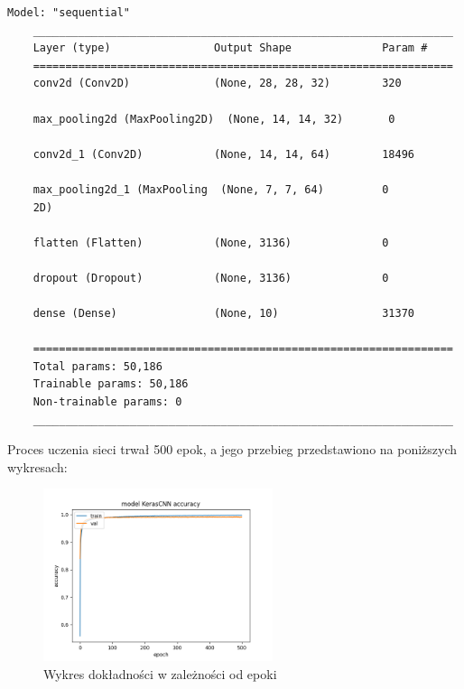\documentclass{article}
\begin{document}
\begin{lstlisting}[style=siec]
    Model: "sequential"
    _________________________________________________________________
    Layer (type)                Output Shape              Param #   
    =================================================================
    conv2d (Conv2D)             (None, 28, 28, 32)        320       
                                                                    
    max_pooling2d (MaxPooling2D)  (None, 14, 14, 32)       0                                                                      
                                                                    
    conv2d_1 (Conv2D)           (None, 14, 14, 64)        18496     
                                                                    
    max_pooling2d_1 (MaxPooling  (None, 7, 7, 64)         0         
    2D)                                                             
                                                                    
    flatten (Flatten)           (None, 3136)              0         
                                                                    
    dropout (Dropout)           (None, 3136)              0         
                                                                    
    dense (Dense)               (None, 10)                31370     
                                                                    
    =================================================================
    Total params: 50,186
    Trainable params: 50,186
    Non-trainable params: 0
    _________________________________________________________________
\end{lstlisting}

Proces uczenia sieci trwał 500 epok, a jego przebieg przedstawiono na poniższych wykresach:

\begin{figure}[H]
    \centering
    \includegraphics[width=0.6\textwidth]{../Saves/KerasCNN/mnist-784/KerasCNN_mnist_784_ep500_acc.png}
    \caption{Wykres dokładności w zależności od epoki}
\end{figure}
\end{document}
